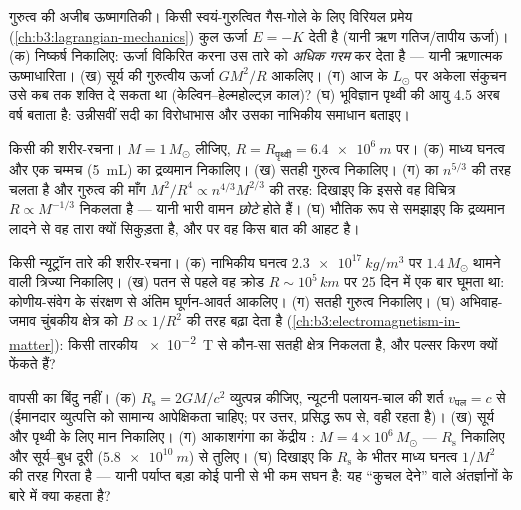 \begin{exercise}[$\star\star$]\label{exo:b3:astrophysics:5}
गुरुत्व की अजीब ऊष्मागतिकी। किसी स्वयं-गुरुत्वित गैस-गोले के लिए
विरियल प्रमेय (\cref{ch:b3:lagrangian-mechanics})
कुल ऊर्जा $E = -K$ देती है (यानी ऋण गतिज/तापीय ऊर्जा)।
(क) निष्कर्ष निकालिए: ऊर्जा विकिरित करना उस तारे को \emph{अधिक गरम}
कर देता है --- यानी ऋणात्मक ऊष्माधारिता। (ख) सूर्य की गुरुत्वीय
ऊर्जा $GM^2/R$ आकलिए। (ग) आज के $L_\odot$ पर अकेला संकुचन उसे कब तक
शक्ति दे सकता था (केल्विन--हेल्महोल्ट्ज़
काल)? (घ) भूविज्ञान पृथ्वी की आयु 4.5 अरब वर्ष बताता है:
उन्नीसवीं सदी का विरोधाभास और उसका नाभिकीय समाधान बताइए।
\end{exercise}

\begin{exercise}[$\star\star$]\label{exo:b3:astrophysics:6}
किसी  की शरीर-रचना। $M = 1\,M_\odot$ लीजिए,
$R = R_{\text{पृथ्वी}} = \qty{6.4e6}{m}$ पर। (क) माध्य
घनत्व और एक चम्मच (\qty{5}{mL}) का द्रव्यमान निकालिए। (ख) सतही
गुरुत्व निकालिए। (ग)  का
 $n^{5/3}$ की तरह चलता है और गुरुत्व की माँग
$M^2/R^4 \propto n^{4/3}M^{2/3}$ की तरह: दिखाइए कि इससे वह
विचित्र $R \propto M^{-1/3}$ निकलता है --- यानी भारी वामन
\emph{छोटे} होते हैं। (घ) भौतिक रूप से समझाइए कि द्रव्यमान लादने से
वह तारा क्यों सिकुड़ता है, और  पर वह किस बात की
आहट है।
\end{exercise}

\begin{exercise}[$\star\star$]\label{exo:b3:astrophysics:7}
किसी न्यूट्रॉन तारे की शरीर-रचना। (क) नाभिकीय घनत्व
$\qty{2.3e17}{kg/m^3}$ पर $1.4\,M_\odot$ थामने वाली त्रिज्या
निकालिए। (ख) पतन से पहले वह क्रोड $R \sim 10^5\,\unit{km}$ पर 25 दिन
में एक बार घूमता था: कोणीय-संवेग के संरक्षण से
अंतिम घूर्णन-आवर्त आकलिए। (ग) सतही
गुरुत्व निकालिए। (घ) अभिवाह-जमाव चुंबकीय क्षेत्र को
$B \propto 1/R^2$ की तरह बढ़ा देता है
(\cref{ch:b3:electromagnetism-in-matter}):
किसी तारकीय \qty{e-2}{T} से कौन-सा सतही क्षेत्र निकलता है, और
पल्सर किरण क्यों फेंकते हैं?
\end{exercise}

\begin{exercise}[$\star\star$]\label{exo:b3:astrophysics:8}
वापसी का बिंदु नहीं। (क) $R_{\text{s}} = 2GM/c^2$ व्युत्पन्न कीजिए,
न्यूटनी पलायन-चाल की शर्त $v_{\text{पल}} = c$ से
(ईमानदार व्युत्पत्ति को सामान्य आपेक्षिकता चाहिए; पर उत्तर,
प्रसिद्ध रूप से, वही रहता है)। (ख) सूर्य और पृथ्वी के लिए मान निकालिए।
(ग) आकाशगंगा का केंद्रीय : $M = 4\times10^6\,M_\odot$
--- $R_{\text{s}}$ निकालिए और सूर्य--बुध
दूरी ($\qty{5.8e10}{m}$) से तुलिए। (घ) दिखाइए कि
$R_{\text{s}}$ के भीतर माध्य घनत्व $1/M^2$ की तरह गिरता है --- यानी
पर्याप्त बड़ा कोई  पानी से भी कम सघन है: यह
``कुचल देने'' वाले अंतर्ज्ञानों के बारे में क्या कहता है?
\end{exercise}

